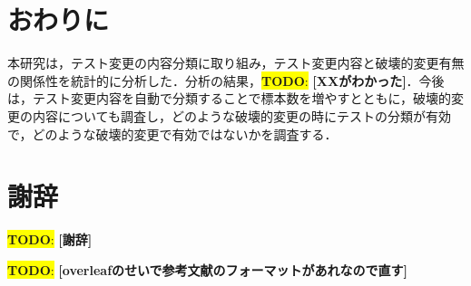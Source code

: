 \documentclass[uplatex,dvipdfmx,a4paper,twocolumn,base=11pt,jbase=11pt,ja=standard]{bxjsarticle}  %
\newcommand{\todo}[1]{\colorbox{yellow}{{\bf TODO}:}{\color{red} {\textbf{[#1]}}}}
\begin{document}
\section{おわりに}

本研究は，テスト変更の内容分類に取り組み，テスト変更内容と破壊的変更有無の関係性を統計的に分析した．分析の結果，\todo{XXがわかった}．今後は，テスト変更内容を自動で分類することで標本数を増やすとともに，破壊的変更の内容についても調査し，どのような破壊的変更の時にテストの分類が有効で，どのような破壊的変更で有効ではないかを調査する．

\section*{謝辞}

\todo{謝辞}

\todo{overleafのせいで参考文献のフォーマットがあれなので直す}
\end{document}
